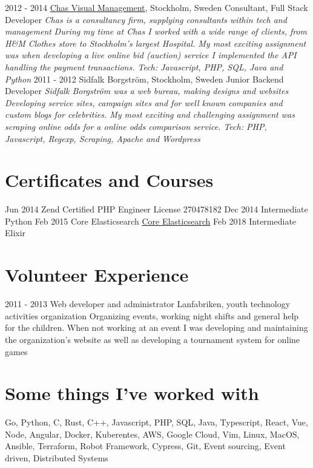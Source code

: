 \documentclass[]{friggeri-cv}
\begin{document}
\begin{entrylist}
  \bigentry
    {2012 - 2014}
    {{\href{https://chas.se/}{Chas Visual Management}}, Stockholm, Sweden} {Consultant, Full Stack Developer}
    {\emph{Chas is a consultancy firm, supplying consultants within tech and management}}
    {\textit{During my time at Chas I worked with a wide range of clients, from H\&M Clothes store to Stockholm's largest Hospital. My most exciting assignment was when developing a live online bid (auction) service I implemented the API handling the payment transactions. Tech: Javascript, PHP, SQL, Java and Python}\newline}
  \bigentry
    {2011 - 2012}
    {Sidfalk Borgström, Stockholm, Sweden} {Junior Backend Developer}
    {\textit{Sidfalk Borgström was a web bureau, making designs and websites}}
    {\emph{Developing service sites, campaign sites and for well known companies and custom blogs for celebrities. My most exciting and challenging assignment was scraping online odds for a online odds comparison service. Tech: PHP, Javascript, Regexp, Scraping, Apache and Wordpress}\newline}
\end{entrylist}

\section{Certificates and Courses}
\begin{entrylist}
  \entry
    {Jun 2014}
    {Zend Certified PHP Engineer}
    {License 270478182}
    {}
  \entry
    {Dec 2014}
    {Intermediate Python}
    {}
    {}
  \entry
    {Feb 2015}
    {Core Elasticsearch}
    {\href{https://training.elastic.co/instructor-led-training/CoreESOperations}{Core Elasticsearch}}
    {}
  \entry
    {Feb 2018}
    {Intermediate Elixir}
    {}
    {}
\end{entrylist}

\section{Volunteer Experience}

\begin{entrylist}
  \entry
    {2011 - 2013}
    {Web developer and administrator}
    {Lanfabriken, youth technology activities organization}
    {Organizing events, working night shifts and general help for the children. When not working at an event I was developing and maintaining the organization's website as well as developing a tournament system for online games}
\end{entrylist}

\section{Some things I've worked with}
 Go, Python, C, Rust, C++, Javascript, PHP, SQL, Java, Typescript, React, Vue, Node, Angular, Docker, Kuberentes, AWS, Google Cloud, Vim, Linux, MacOS, Ansible, Terraform, Robot Framework, Cypress, Git, Event sourcing, Event driven, Distributed Systems
\end{document}
